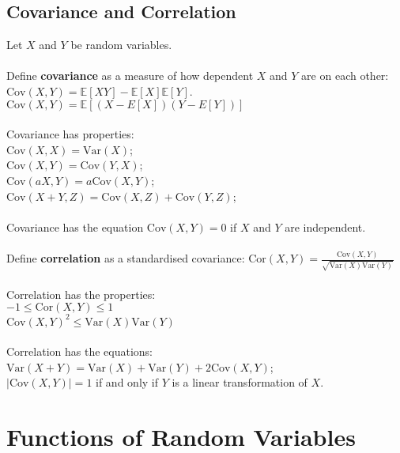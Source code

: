 \documentclass{article}
\begin{document}
		\subsection{Covariance and Correlation}
			Let $X$ and $Y$ be random variables. \\
			\\
			Define \textbf{covariance} as a measure of how dependent $X$ and $Y$ are on each other: \\
			\textbullet \; $\text{Cov}(X,Y) = \mathbb{E}[XY] - \mathbb{E}[X]\mathbb{E}[Y]$. \\
			\textbullet \; $\text{Cov}(X,Y) = \mathbb{E}[(X-E[X])(Y-E[Y])]$ \\
			\\
			Covariance has properties: \\
			\textbullet \; $\text{Cov}(X,X) = \text{Var}(X)$; \\
			\textbullet \; $\text{Cov}(X,Y) = \text{Cov}(Y,X)$; \\
			\textbullet \; $\text{Cov}(aX,Y) = a\text{Cov}(X,Y)$; \\
			\textbullet \; $\text{Cov}(X+Y,Z) = \text{Cov}(X,Z) + \text{Cov}(Y,Z)$; \\
			\\
			Covariance has the equation $\text{Cov}(X,Y) = 0$ if $X$ and $Y$ are independent. \\
			\\
			Define \textbf{correlation} as a standardised covariance: $\text{Cor}(X,Y) = \frac{\text{Cov}(X,Y)}{\sqrt{\text{Var}(X)\text{Var}(Y)}}$ \\
			\\
			Correlation has the properties: \\
			\textbullet \; $-1 \leq \text{Cor}(X,Y) \leq 1$ \\
			\textbullet \; $\text{Cov}(X,Y)^2 \leq \text{Var}(X)\text{Var}(Y)$ \\
			\\
			Correlation has the equations: \\
			\textbullet \; $\text{Var}(X+Y) = \text{Var}(X) + \text{Var}(Y) + 2\text{Cov}(X,Y)$; \\
			\textbullet \; $|\text{Cov}(X,Y)| = 1$ if and only if $Y$ is a linear transformation of $X$. \\
			
	\section{Functions of Random Variables}
	
\end{document}
